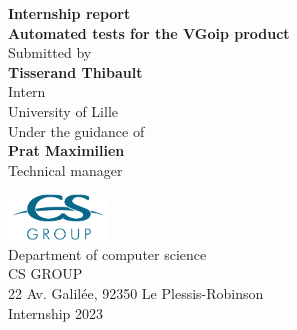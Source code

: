 \begin{titlepage}
    \begin{center}
        \textup{\small {\bf Internship report}}\\[0.3in]

        \Large \textbf {Automated tests for the VGoip product}\\[0.7in]

        \normalsize Submitted by\\[0.2in]
        \textbf{Tisserand Thibault}\\
        Intern\\
        University of Lille\\

        \vspace{.2in}
        Under the guidance of\\[0.2in]
        \textbf{Prat Maximilien}\\
        Technical manager

        \vspace{.3in}

        \includegraphics[width=0.2\textwidth]{img/csgroup.png}\\[0.1in]
        \Large{Department of computer science}\\
        \normalsize
        \textsc{CS GROUP}\\
        22 Av. Galilée, 92350 Le Plessis-Robinson\\
        \vspace{0.2cm}
        Internship 2023
    \end{center}
\end{titlepage}